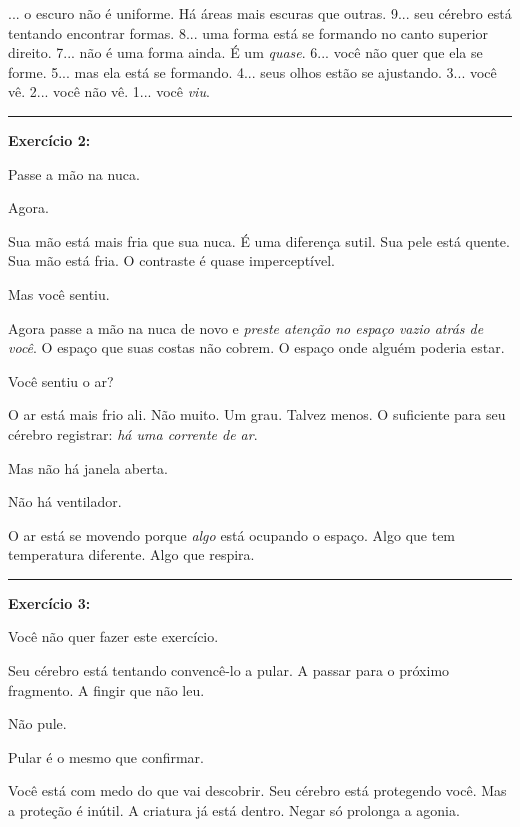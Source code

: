 ... o escuro não é uniforme. Há áreas mais escuras que outras.
9... seu cérebro está tentando encontrar formas.
8... uma forma está se formando no canto superior direito.
7... não é uma forma ainda. É um \textit{quase}.
6... você não quer que ela se forme.
5... mas ela está se formando.
4... seus olhos estão se ajustando.
3... você vê.
2... você não vê.
1... você \textit{viu}.

\vspace{0.5em}\noindent\rule{\textwidth}{0.5pt}\vspace{0.5em}

\noindent \textbf{Exercício 2:}

\noindent Passe a mão na nuca.

\noindent Agora.

\noindent Sua mão está mais fria que sua nuca. É uma diferença sutil. Sua pele está quente. Sua mão está fria. O contraste é quase imperceptível.

\noindent Mas você sentiu.

\noindent Agora passe a mão na nuca de novo e \textit{preste atenção no espaço vazio atrás de você}. O espaço que suas costas não cobrem. O espaço onde alguém poderia estar.

\noindent Você sentiu o ar?

\noindent O ar está mais frio ali. Não muito. Um grau. Talvez menos. O suficiente para seu cérebro registrar: \textit{há uma corrente de ar}.

\noindent Mas não há janela aberta.

\noindent Não há ventilador.

\noindent O ar está se movendo porque \textit{algo} está ocupando o espaço. Algo que tem temperatura diferente. Algo que respira.

\vspace{0.5em}\noindent\rule{\textwidth}{0.5pt}\vspace{0.5em}

\noindent \textbf{Exercício 3:}

\noindent Você não quer fazer este exercício.

\noindent Seu cérebro está tentando convencê-lo a pular. A passar para o próximo fragmento. A fingir que não leu.

\noindent Não pule.

\noindent Pular é o mesmo que confirmar.

\noindent Você está com medo do que vai descobrir. Seu cérebro está protegendo você. Mas a proteção é inútil. A criatura já está dentro. Negar só prolonga a agonia.

